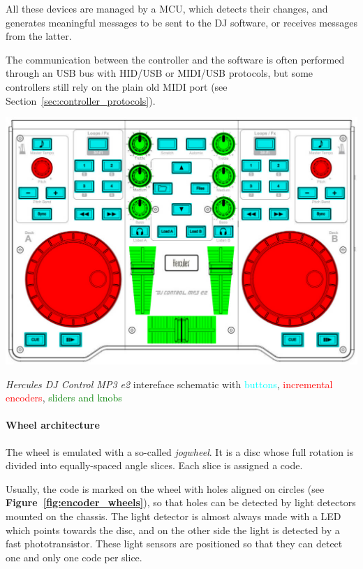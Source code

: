 \documentclass[a4paper,10pt]{article}
\makeatletter
\newenvironment{figurehere}{\def\@captype{figure}\vspace{2ex}}{\vspace{2ex}}
\newcommand{\citef}[1]{\textbf{Figure~\ref{#1}}}
\makeatother
\begin{document}
\begin{multicols}{2}
All these devices are managed by a MCU, which detects their changes, and
generates meaningful messages to be sent to the DJ software, or receives
messages from the latter.

The communication between the controller and the software is often performed
through an USB bus with HID/USB or MIDI/USB protocols, but some controllers
still rely on the plain old MIDI port (see Section~\ref{sec:controller_protocols}).

\begin{figurehere}
	\centering
	\includegraphics[keepaspectratio=true,width=\columnwidth]{images/hercules_mp3e2_schematic.png}
	\caption{\emph{Hercules DJ Control MP3 e2} \cite{hercules_djcmp3e2}
	intereface schematic with \textcolor{cyan}{buttons}, \textcolor{red}{incremental encoders},
	\textcolor{green}{sliders and knobs}}
	\label{fig:hercules_mp3e2_schematic}
\end{figurehere}


\paragraph{Wheel architecture}
The wheel is emulated with a so-called \emph{jogwheel}. It is a disc whose
full rotation is divided into equally-spaced angle slices. Each slice is
assigned a code.

Usually, the code is marked on the wheel with holes aligned on circles (see
\citef{fig:encoder_wheels}), so that holes can be detected by light detectors
mounted on the chassis. The light detector is almost always made with a LED
which points towards the disc, and on the other side the light is detected by
a fast phototransistor. These light sensors are positioned so that they can
detect one and only one code per slice.


\end{multicols}
\end{document}
